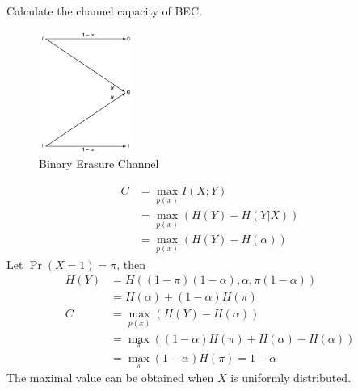 \begin{exercise}[BSC]{Calculate the channel capacity of BEC.
  \begin{figure}[H]
    \centering
    \includegraphics[height=4cm]{img/6-2.png}
    \caption{Binary Erasure Channel}
    \label{fig:bec}
  \end{figure}}
  \begin{solution}
    \begin{equation}\begin{aligned}
      C &=\max _{p(x)} I(X ; Y) \\
      &=\max _{p(x)}(H(Y)-H(Y | X))\\
      &=\max _{p(x)} (H(Y)-H(\alpha))
      \end{aligned}\end{equation}
      Let $\Pr\left(X = 1\right) = \pi$, then
      \begin{equation}
        \begin{aligned}
          H(Y) &= H((1-\pi)(1-\alpha),\alpha,\pi(1-\alpha)) \\
          &= H(\alpha) + (1-\alpha)H(\pi) \\
          C &= \max_{p(x)} (H(Y)-H(\alpha)) \\
          &= \max_{\pi} ((1-\alpha)H(\pi)+H(\alpha)-H(\alpha)) \\
          &= \max_{\pi} (1-\alpha)H(\pi) = 1-\alpha
        \end{aligned}
      \end{equation}
      The maximal value can be obtained when $X$ is uniformly distributed.
  \end{solution}
  \label{ex2}
\end{exercise}

